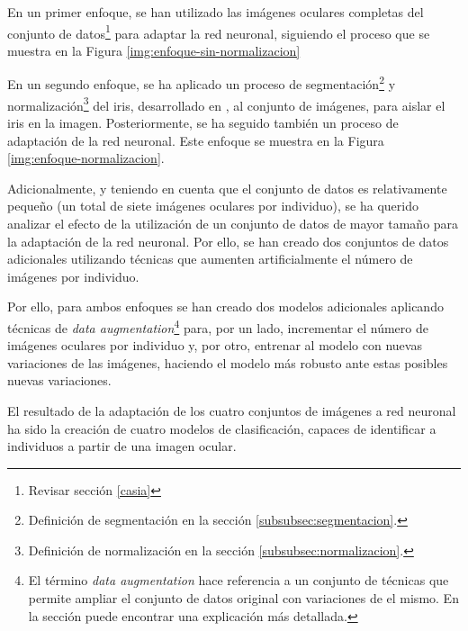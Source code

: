En un primer enfoque, se han utilizado las imágenes oculares completas del conjunto de datos\footnote{Revisar sección \ref{casia}} para adaptar la red neuronal, siguiendo el proceso que se muestra en la Figura \ref{img:enfoque-sin-normalizacion}



En un segundo enfoque, se ha aplicado un proceso de segmentación\footnote{Definición de segmentación en la sección \ref{subsubsec:segmentacion}.} y normalización\footnote{Definición de normalización en la sección \ref{subsubsec:normalizacion}.} del iris, desarrollado en \cite{tfg_iris_2020}, al conjunto de imágenes, para aislar el iris en la imagen. Posteriormente, se ha seguido también un proceso de adaptación de la red neuronal. Este enfoque se muestra en la Figura \ref{img:enfoque-normalizacion}. 




Adicionalmente, y teniendo en cuenta que el conjunto de datos es relativamente pequeño (un total de siete imágenes oculares por individuo), se ha querido analizar el efecto de la utilización de un conjunto de datos de mayor tamaño para la adaptación de la red neuronal. Por ello, se han creado dos conjuntos de datos adicionales utilizando técnicas que aumenten artificialmente el número de imágenes por individuo.

Por ello, para ambos enfoques se han creado dos modelos adicionales aplicando técnicas de \textit{data augmentation}\footnote{El término \textit{data augmentation} hace referencia a un conjunto de técnicas que permite ampliar el conjunto de datos original con variaciones de el mismo. En la sección  puede encontrar una explicación más detallada.} para, por un lado, incrementar el número de imágenes oculares por individuo y, por otro, entrenar al modelo con nuevas variaciones de las imágenes, haciendo el modelo más robusto ante estas posibles nuevas variaciones.

El resultado de la adaptación de los cuatro conjuntos de imágenes a red neuronal ha sido la creación de cuatro modelos de clasificación, capaces de identificar a individuos a partir de una imagen ocular. 

